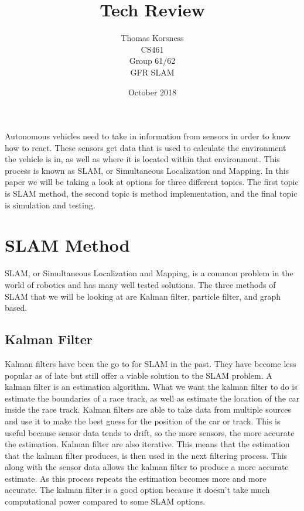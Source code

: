 \documentclass[10pt, onecolumn, draftclsnofoot, letterpaper,compsoc]{IEEEtran}
\title{Tech Review}
\author{Thomas Korsness \\
        CS461 \\
        Group 61/62 \\
        GFR SLAM
        }
\date{October 2018}
\begin{document}
\maketitle
Autonomous vehicles need to take in information from sensors in order to know how to react. These sensors get data that is used to calculate the environment the vehicle is in, as well as where it is located within that environment. This process is known as SLAM, or Simultaneous Localization and Mapping. In this paper we will be taking a look at options for three different topics. The first  topic is SLAM method, the second topic is method implementation, and the final topic is simulation and testing.

\newpage
\tableofcontents
\newpage

\section{SLAM Method}
SLAM, or Simultaneous Localization and Mapping, is a common problem in the world of robotics and has many well tested solutions. The three methods of SLAM that we will be looking at are Kalman filter, particle filter, and graph based.

\subsection{Kalman Filter}
Kalman filters have been the go to for SLAM in the past. They have become less popular as of late but still offer a viable solution to the SLAM problem. A kalman filter is an estimation algorithm. What we want the kalman filter to do is estimate the boundaries of a race track, as well as estimate the location of the car inside the race track. Kalman filters are able to take data from multiple sources and use it to make the best guess for the position of the car or track. This is useful because sensor data tends to drift, so the more sensors, the more accurate the estimation. Kalman filter are also iterative. This means that the estimation that the kalman filter produces, is then used in the next filtering process. This along with the sensor data allows the kalman filter to produce a more accurate estimate. As this process repeats the estimation becomes more and more accurate. The kalman filter is a good option because it doesn't take much computational power compared to some SLAM options.
\end{document}

